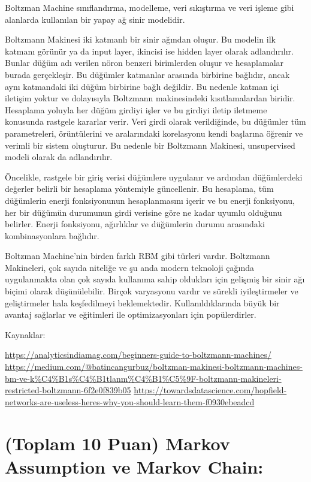 \documentclass[11pt]{article}
\begin{document}
Boltzman Machine sınıflandırma, modelleme, veri sıkıştırma ve veri işleme gibi alanlarda kullanılan bir yapay ağ sinir modelidir. 

Boltzmann Makinesi iki katmanlı bir sinir ağından oluşur. Bu modelin ilk katmanı görünür ya da input layer, ikincisi ise hidden layer olarak adlandırılır. Bunlar düğüm adı verilen nöron benzeri birimlerden oluşur ve hesaplamalar burada gerçekleşir. Bu düğümler katmanlar arasında birbirine bağlıdır, ancak aynı katmandaki iki düğüm birbirine bağlı değildir. Bu nedenle katman içi iletişim yoktur ve dolayısıyla Boltzmann makinesindeki kısıtlamalardan biridir. Hesaplama yoluyla her düğüm girdiyi işler ve bu girdiyi iletip iletmeme konusunda rastgele kararlar verir. Veri girdi olarak verildiğinde, bu düğümler tüm parametreleri, örüntülerini ve aralarındaki korelasyonu kendi başlarına öğrenir ve verimli bir sistem oluşturur. Bu nedenle bir Boltzmann Makinesi, unsupervised modeli olarak da adlandırılır.

Öncelikle, rastgele bir giriş verisi düğümlere uygulanır ve ardından düğümlerdeki değerler belirli bir hesaplama yöntemiyle güncellenir. Bu hesaplama, tüm düğümlerin enerji fonksiyonunun hesaplanmasını içerir ve bu enerji fonksiyonu, her bir düğümün durumunun girdi verisine göre ne kadar uyumlu olduğunu belirler. Enerji fonksiyonu, ağırlıklar ve düğümlerin durumu arasındaki kombinasyonlara bağlıdır.

Boltzman Machine'nin birden farklı RBM gibi türleri vardır. Boltzmann Makineleri, çok sayıda niteliğe ve şu anda modern teknoloji çağında uygulanmakta olan çok sayıda kullanıma sahip oldukları için gelişmiş bir sinir ağı biçimi olarak düşünülebilir. Birçok varyasyonu vardır ve sürekli iyileştirmeler ve geliştirmeler hala keşfedilmeyi beklemektedir. Kullanıldıklarında büyük bir avantaj sağlarlar ve eğitimleri ile optimizasyonları için popülerdirler.

 Kaynaklar: 

    \url{https://analyticsindiamag.com/beginners-guide-to-boltzmann-machines/} \newline
    \url{https://medium.com/@batincangurbuz/boltzman-makinesi-boltzmann-machines-bm-ve-k%C4%B1s%C4%B1tlanm%C4%B1%C5%9F-boltzmann-makineleri-restricted-boltzmann-6f2e0f839b05}\newline
    \url{https://towardsdatascience.com/hopfield-networks-are-useless-heres-why-you-should-learn-them-f0930ebeadcd}

\section{(Toplam 10 Puan) Markov Assumption ve Markov Chain:}
\end{document}
